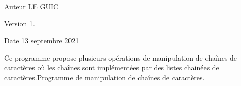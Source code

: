 \begin{DoxyAuthor}{Auteur}
LE GUIC 
\end{DoxyAuthor}
\begin{DoxyVersion}{Version}
1. 
\end{DoxyVersion}
\begin{DoxyDate}{Date}
13 septembre 2021
\end{DoxyDate}
Ce programme propose plusieurs opérations de manipulation de chaînes de caractères où les chaînes sont implémentées par des listes chainées de caractères.\+Programme de manipulation de chaînes de caractères. 